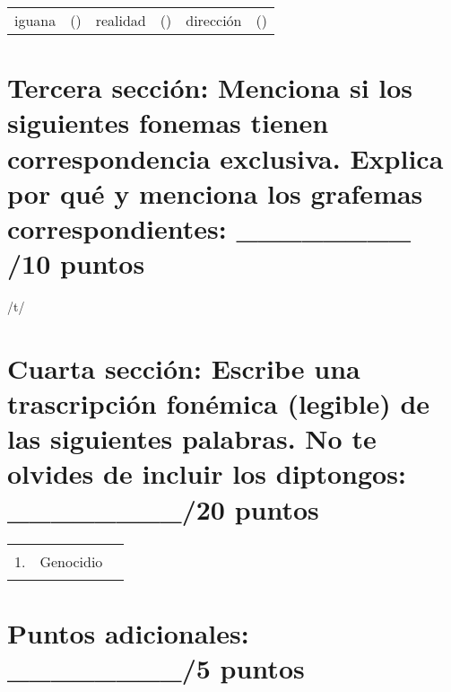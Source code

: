 \documentclass[12pt]{exam}
\begin{document}
	\begin{tabular}{lclclc}
		\hspace{20mm} iguana		&	\hspace{5mm}(\hspace{2mm})	\hspace{5mm} & realidad	    & \hspace{5mm}(\hspace{2mm}) \hspace{5mm} & dirección	& \hspace{5mm}(\hspace{2mm})\\
	\end{tabular}







\section{Tercera sección: Menciona si los siguientes fonemas tienen correspondencia exclusiva. Explica por qué y menciona los grafemas correspondientes: \_\_\_\_\_\_\_\_ /10 puntos}

	\begin{questions}
		\question /t/ 
		\fillwithlines{.75in}
	\end{questions}







\section{Cuarta sección: Escribe una trascripción fonémica (legible) de las siguientes palabras. No te olvides de incluir los diptongos: \_\_\_\_\_\_\_\_/20 puntos}


\renewcommand{\arraystretch}{1.75}
	\begin{tabular}{llc}
		1.  & Genocidio		& \hspace{5mm}\rule{55mm}{.3mm} \\
	\end{tabular}




\section{Puntos adicionales: \_\_\_\_\_\_\_\_/5 puntos}	
\end{document}
